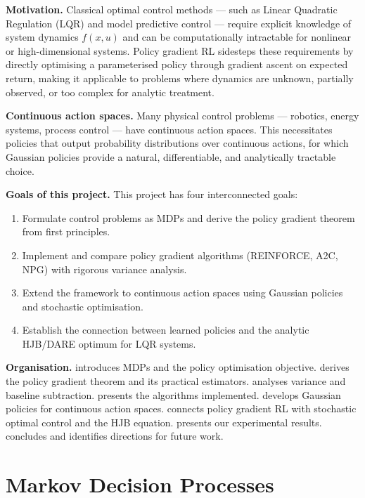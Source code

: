 \documentclass[11pt, a4paper]{article}
\begin{document}
\textbf{Motivation.}
Classical optimal control methods --- such as Linear Quadratic Regulation (LQR)
and model predictive control --- require explicit knowledge of system dynamics
$f(x, u)$ and can be computationally intractable for nonlinear or high-dimensional
systems.
Policy gradient RL sidesteps these requirements by directly optimising a
parameterised policy through gradient ascent on expected return, making it
applicable to problems where dynamics are unknown, partially observed, or
too complex for analytic treatment.

\textbf{Continuous action spaces.}
Many physical control problems --- robotics, energy systems, process control ---
have continuous action spaces.
This necessitates policies that output probability distributions over continuous
actions, for which Gaussian policies provide a natural, differentiable, and
analytically tractable choice.

\textbf{Goals of this project.}
This project has four interconnected goals:
\begin{enumerate}[leftmargin=1.5em]
    \item Formulate control problems as MDPs and derive the policy gradient
    theorem from first principles.
    \item Implement and compare policy gradient algorithms (REINFORCE, A2C, NPG)
    with rigorous variance analysis.
    \item Extend the framework to continuous action spaces using Gaussian policies
    and stochastic optimisation.
    \item Establish the connection between learned policies and the analytic
    HJB/DARE optimum for LQR systems.
\end{enumerate}

\textbf{Organisation.}
 introduces MDPs and the policy optimisation objective.
 derives the policy gradient theorem and its practical estimators.
 analyses variance and baseline subtraction.
 presents the algorithms implemented.
 develops Gaussian policies for continuous action spaces.
 connects policy gradient RL with stochastic optimal
control and the HJB equation.
 presents our experimental results.
 concludes and identifies directions for future work.

\section{Markov Decision Processes}
\label{sec:mdp}
\end{document}
